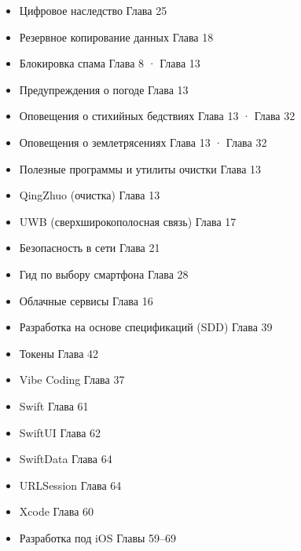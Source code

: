 \begin{itemize}
  \item Цифровое наследство Глава 25
  \item Резервное копирование данных Глава 18
  \item Блокировка спама Глава 8 · Глава 13
  \item Предупреждения о погоде Глава 13
  \item Оповещения о стихийных бедствиях Глава 13 · Глава 32
  \item Оповещения о землетрясениях Глава 13 · Глава 32
  \item Полезные программы и утилиты очистки Глава 13
  \item QingZhuo (очистка) Глава 13
  \item UWB (сверхширокополосная связь) Глава 17
  \item Безопасность в сети Глава 21
  \item Гид по выбору смартфона Глава 28
  \item Облачные сервисы Глава 16
  \item Разработка на основе спецификаций (SDD) Глава 39
  \item Токены Глава 42
  \item Vibe Coding Глава 37
  \item Swift Глава 61
  \item SwiftUI Глава 62
  \item SwiftData Глава 64
  \item URLSession Глава 64
  \item Xcode Глава 60
  \item Разработка под iOS Главы 59–69
\end{itemize}


